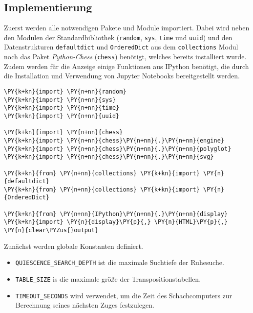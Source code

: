 \subsection{Implementierung}

Zuerst werden alle notwendigen Pakete und Module importiert. Dabei wird
neben den Modulen der Standardbibliothek (\texttt{random}, \texttt{sys},
\texttt{time} und \texttt{uuid}) und den Datenstrukturen
\texttt{defaultdict} und \texttt{OrderedDict} aus dem
\texttt{collections} Modul noch das Paket \emph{Python-Chess}
(\texttt{chess}) benötigt, welches bereits installiert wurde. Zudem
werden für die Anzeige einige Funktionen aus IPython benötigt, die durch
die Installation und Verwendung von Jupyter Notebooks bereitgestellt
werden.

\bigskip

    \begin{tcolorbox}[fontupper=\linespread{.66}\selectfont, breakable, size=fbox, boxrule=1pt, pad at break*=1mm,colback=cellbackground, colframe=cellborder]
\begin{Verbatim}[commandchars=\\\{\}]
\PY{k+kn}{import} \PY{n+nn}{random}
\PY{k+kn}{import} \PY{n+nn}{sys}
\PY{k+kn}{import} \PY{n+nn}{time}
\PY{k+kn}{import} \PY{n+nn}{uuid}

\PY{k+kn}{import} \PY{n+nn}{chess}
\PY{k+kn}{import} \PY{n+nn}{chess}\PY{n+nn}{.}\PY{n+nn}{engine}
\PY{k+kn}{import} \PY{n+nn}{chess}\PY{n+nn}{.}\PY{n+nn}{polyglot}
\PY{k+kn}{import} \PY{n+nn}{chess}\PY{n+nn}{.}\PY{n+nn}{svg}

\PY{k+kn}{from} \PY{n+nn}{collections} \PY{k+kn}{import} \PY{n}{defaultdict}
\PY{k+kn}{from} \PY{n+nn}{collections} \PY{k+kn}{import} \PY{n}{OrderedDict}

\PY{k+kn}{from} \PY{n+nn}{IPython}\PY{n+nn}{.}\PY{n+nn}{display} \PY{k+kn}{import} \PY{n}{display}\PY{p}{,} \PY{n}{HTML}\PY{p}{,} \PY{n}{clear\PYZus{}output}
\end{Verbatim}
\end{tcolorbox}

    Zunächst werden globale Konstanten definiert.

\begin{itemize}
\tightlist
\item
  \texttt{QUIESCENCE\_SEARCH\_DEPTH} ist die maximale Suchtiefe der
  Ruhesuche.
\item
  \texttt{TABLE\_SIZE} is die maximale größe der Transpositionstabellen.
\item
  \texttt{TIMEOUT\_SECONDS} wird verwendet, um die Zeit des
  Schachcomputers zur Berechnung seines nächsten Zuges festzulegen.
\end{itemize}

